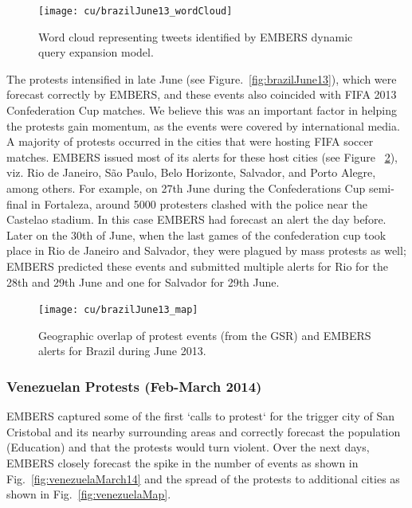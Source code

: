 \begin{figure}[H]
\centering
\texttt{[image: cu/brazilJune13\_wordCloud]}
\caption{Word cloud representing tweets identified by EMBERS dynamic query expansion model.}
\label{fig:brazilJune13_wordCloud}
\end{figure}

The protests intensified in late June (see Figure.~\ref{fig:brazilJune13}), which were
forecast correctly by EMBERS, and these events
also coincided with FIFA 2013 Confederation Cup matches. We believe this was an important factor in helping
the protests gain momentum,
as the events were covered by international media. A majority of protests
occurred in the cities that were hosting FIFA soccer matches.
EMBERS issued most of its alerts for these host cities (see Figure
~\ref{fig:brazilJune13_map}), viz.
Rio de Janeiro, São Paulo,
Belo Horizonte, Salvador, and Porto Alegre,
among others. For example, on 27th June during the Confederations Cup
semi-final in Fortaleza, around 5000 protesters clashed with the police
near the Castelao stadium. In this case EMBERS had forecast an alert the
day before. Later on the 30th of June, when the last games of the
confederation cup took place in Rio de Janeiro and Salvador, they
were plagued by mass protests as well; EMBERS predicted these events and
submitted multiple alerts for Rio for the 28th and 29th June and one for
Salvador for 29th June.

\begin{figure}[H]
\centering
\texttt{[image: cu/brazilJune13\_map]}
\caption{Geographic overlap of protest events (from the GSR) and EMBERS
alerts for Brazil during June 2013.}
\label{fig:brazilJune13_map}
\end{figure}

\subsubsection*{Venezuelan Protests (Feb-March 2014)}

EMBERS captured some of the first `calls to protest` for the trigger city of
San Cristobal and its nearby surrounding areas and correctly forecast the
population (Education) and that the protests would turn violent. Over the next
days, EMBERS closely forecast the spike in the number of events as shown
in Fig.~\ref{fig:venezuelaMarch14} and the spread
of the protests to additional cities as shown in
Fig.~\ref{fig:venezuelaMap}.

